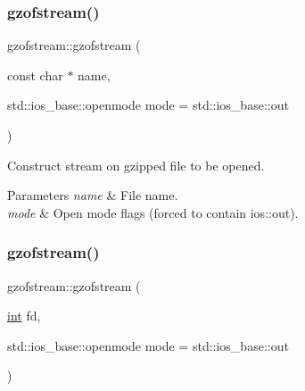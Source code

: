 \mbox{\label{classgzofstream_a4334d31aab99f8c9c2277b672a55c78f}} 
\subsubsection{\texorpdfstring{gzofstream()}{gzofstream()}\hspace{0.1cm}{\footnotesize\ttfamily [2/3]}}
{\footnotesize\ttfamily gzofstream\+::gzofstream (\begin{DoxyParamCaption}\item[{const char $\ast$}]{name,  }\item[{std\+::ios\+\_\+base\+::openmode}]{mode = {\ttfamily std\+:\+:ios\+\_\+base\+:\+:out} }\end{DoxyParamCaption})\hspace{0.3cm}{\ttfamily [explicit]}}



Construct stream on gzipped file to be opened. 


\begin{DoxyParams}{Parameters}
{\em name} & File name. \\
\hline
{\em mode} & Open mode flags (forced to contain ios\+::out). \\
\hline
\end{DoxyParams}
\mbox{\label{classgzofstream_aa94d0c8414119a52f2a7f42aa0440941}} 
\subsubsection{\texorpdfstring{gzofstream()}{gzofstream()}\hspace{0.1cm}{\footnotesize\ttfamily [3/3]}}
{\footnotesize\ttfamily gzofstream\+::gzofstream (\begin{DoxyParamCaption}\item[{\hyperlink{lp__lib_8h_adeb9ec6400320e4923ac9d836d509ddb}{int}}]{fd,  }\item[{std\+::ios\+\_\+base\+::openmode}]{mode = {\ttfamily std\+:\+:ios\+\_\+base\+:\+:out} }\end{DoxyParamCaption})\hspace{0.3cm}{\ttfamily [explicit]}}



